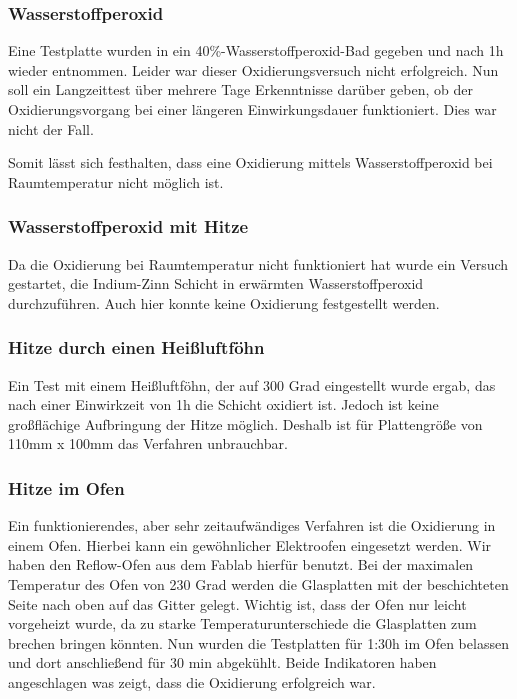 \subsubsection{Wasserstoffperoxid}


Eine Testplatte wurden in ein 40\%-Wasserstoffperoxid-Bad gegeben und nach 1h wieder entnommen. Leider war dieser Oxidierungsversuch nicht erfolgreich.
Nun soll ein Langzeittest über mehrere Tage Erkenntnisse darüber geben, ob der Oxidierungsvorgang bei einer längeren Einwirkungsdauer funktioniert. Dies war nicht der Fall.

Somit lässt sich festhalten, dass eine Oxidierung mittels Wasserstoffperoxid bei Raumtemperatur nicht möglich ist.

\subsubsection{Wasserstoffperoxid mit Hitze}

Da die Oxidierung bei Raumtemperatur nicht funktioniert hat wurde ein Versuch gestartet, die Indium-Zinn Schicht in erwärmten Wasserstoffperoxid durchzuführen. Auch hier konnte keine Oxidierung festgestellt werden.

\subsubsection{Hitze durch einen Heißluftföhn}

Ein Test mit einem Heißluftföhn, der auf 300 Grad eingestellt wurde ergab, das nach einer Einwirkzeit von 1h die Schicht oxidiert ist. Jedoch ist keine großflächige Aufbringung der Hitze möglich. Deshalb ist für Plattengröße von 110mm x 100mm das Verfahren unbrauchbar.

\subsubsection{Hitze im Ofen}

Ein funktionierendes, aber sehr zeitaufwändiges Verfahren ist die Oxidierung in einem Ofen. Hierbei kann ein gewöhnlicher Elektroofen eingesetzt werden. Wir haben den Reflow-Ofen aus dem Fablab hierfür benutzt.
Bei der maximalen Temperatur des Ofen von 230 Grad werden die Glasplatten mit der beschichteten Seite nach oben auf das Gitter gelegt. Wichtig ist, dass der Ofen nur leicht vorgeheizt wurde, da zu starke Temperaturunterschiede die Glasplatten zum brechen bringen könnten. Nun wurden die Testplatten für 1:30h im Ofen belassen und dort anschließend für 30 min abgekühlt.
Beide Indikatoren haben angeschlagen was zeigt, dass die Oxidierung erfolgreich war.\\

